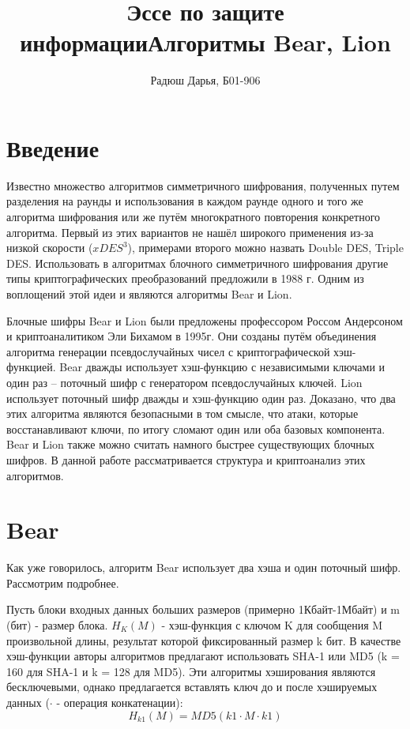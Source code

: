 \documentclass[12pt]{article}
\title{Эссе по защите информации}
\title{Алгоритмы Bear, Lion}
\author{Радюш Дарья, Б01-906}
\begin{document}
\maketitle



\section{Введение}

Известно множество алгоритмов симметричного шифрования, полученных путем разделения на раунды и использования в каждом раунде одного и того же алгоритма шифрования или же путём многократного повторения конкретного алгоритма. Первый из этих вариантов не нашёл широкого применения из-за низкой скорости ($xDES^{3}$), примерами второго можно назвать Double DES, Triple DES. Использовать в алгоритмах блочного симметричного шифрования другие типы криптографических преобразований предложили в 1988 г. Одним из воплощений этой идеи и являются алгоритмы Bear и Lion.   

Блочные шифры Bear и Lion были предложены профессором Россом Андерсоном и криптоаналитиком Эли Бихамом в 1995г. Они созданы путём объединения алгоритма генерации псевдослучайных чисел с криптографической хэш-функцией. Bear дважды использует хэш-функцию с независимыми ключами и один раз -- поточный шифр с генератором псевдослучайных ключей. Lion использует поточный шифр дважды и хэш-функцию один раз. Доказано, что два этих алгоритма являются безопасными в том смысле, что атаки, которые восстанавливают ключи, по итогу сломают один или оба базовых компонента.  Bear и Lion также можно считать намного быстрее существующих блочных шифров. В данной работе рассматривается структура и криптоанализ этих алгоритмов.

\section{Bear}

Как уже говорилось, алгоритм Bear использует два хэша и один поточный шифр. Рассмотрим подробнее.

Пусть блоки входных данных больших размеров (примерно 1Кбайт-1Мбайт) и m (бит) - размер блока. ${H_{K}(M)}$ - хэш-функция с ключом K для сообщения M произвольной длины, результат которой фиксированный размер k бит. В качестве хэш-функции авторы алгоритмов предлагают использовать SHA-1 или MD5 (k = 160 для SHA-1 и k = 128 для MD5). Эти алгоритмы хэширования являются бесключевыми, однако предлагается вставлять ключ до и после хэшируемых данных (${\cdot}$ - операция конкатенации):
                 \[H_{k1}(M) = {MD5(k1\cdot M \cdot k1)}\]
                  
\end{document}
